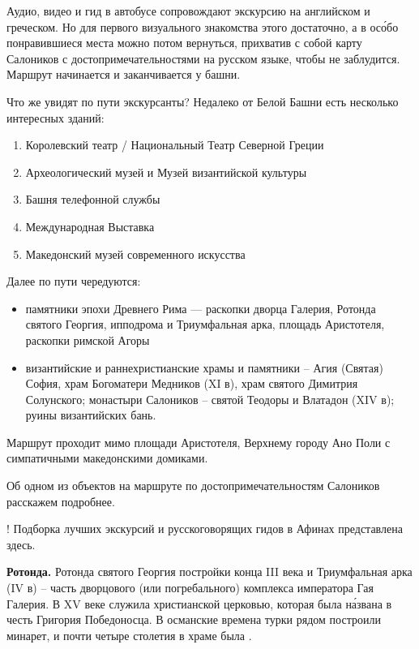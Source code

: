 Аудио, видео и гид в автобусе сопровождают экскурсию на английском и греческом. Но для первого визуального знакомства этого достаточно, а в ос\'{о}бо понравившиеся места можно потом вернуться, прихватив с собой карту Салоников с достопримечательностями на русском языке, чтобы не заблудится. Маршрут начинается и заканчивается у башни.

Что же увидят по пути экскурсанты? Недалеко от Белой Башни есть несколько интересных зданий:
\begin{enumerate}
    \item Королевский театр / Национальный Театр Северной Греции
    \item Археологический музей и Музей византийской культуры
    \item Башня телефонной службы
    \item Международная Выставка
    \item Македонский музей современного искусства
\end{enumerate}
Далее по пути чередуются:
\begin{itemize}
    \item памятники эпохи Древнего Рима — раскопки дворца Галерия, Ротонда святого Георгия,  ипподрома и Триумфальная арка, площадь Аристотеля, раскопки римской Агоры
    \item византийские и раннехристианские храмы и памятники – Агия (Святая) София, храм Богоматери Медников (XI в), храм святого Димитрия Солунского; монастыри Салоников – святой Теодоры и Влатадон (XIV в); руины византийских бань.
\end{itemize}

Маршрут проходит мимо площади Аристотеля, Верхнему городу Ано Поли с симпатичными  македонскими домиками.

Об одном из объектов на маршруте по достопримечательностям Салоников расскажем подробнее.

! Подборка лучших экскурсий и русскоговорящих гидов в Афинах представлена здесь.

\textbf{Ротонда.} Ротонда святого Георгия постройки конца III века и Триумфальная арка (IV в) – часть дворцового (или погребального) комплекса императора Гая Галерия. В XV веке служила христианской церковью, которая была н\'{а}звана в честь Григория Победоносца. В османские времена турки рядом построили минарет, и почти четыре столетия в храме была .

